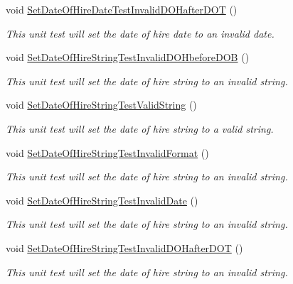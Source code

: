 \begin{DoxyCompactItemize}
void \hyperlink{class_my_all_employee_1_1_tests_1_1_full_time_employee_tests_a08e1fe6af4086293b66b5646cef6f712}{Set\+Date\+Of\+Hire\+Date\+Test\+Invalid\+D\+O\+Hafter\+D\+O\+T} ()
\begin{DoxyCompactList}\small\item\em This unit test will set the date of hire date to an invalid date. \end{DoxyCompactList}\item 
void \hyperlink{class_my_all_employee_1_1_tests_1_1_full_time_employee_tests_aebed253ddcbbee1853a6b967c93d6257}{Set\+Date\+Of\+Hire\+String\+Test\+Invalid\+D\+O\+Hbefore\+D\+O\+B} ()
\begin{DoxyCompactList}\small\item\em This unit test will set the date of hire string to an invalid string. \end{DoxyCompactList}\item 
void \hyperlink{class_my_all_employee_1_1_tests_1_1_full_time_employee_tests_a2832cf212d439622e5cd3764771c1bc4}{Set\+Date\+Of\+Hire\+String\+Test\+Valid\+String} ()
\begin{DoxyCompactList}\small\item\em This unit test will set the date of hire string to a valid string. \end{DoxyCompactList}\item 
void \hyperlink{class_my_all_employee_1_1_tests_1_1_full_time_employee_tests_a9cdc68100bbbf4e8deb270b9b63e718a}{Set\+Date\+Of\+Hire\+String\+Test\+Invalid\+Format} ()
\begin{DoxyCompactList}\small\item\em This unit test will set the date of hire string to an invalid string. \end{DoxyCompactList}\item 
void \hyperlink{class_my_all_employee_1_1_tests_1_1_full_time_employee_tests_ad6ce9c3cfd0b1970fbc8f616c40ca52d}{Set\+Date\+Of\+Hire\+String\+Test\+Invalid\+Date} ()
\begin{DoxyCompactList}\small\item\em This unit test will set the date of hire string to an invalid string. \end{DoxyCompactList}\item 
void \hyperlink{class_my_all_employee_1_1_tests_1_1_full_time_employee_tests_a6d27a8759d55854878fb6b8a00b8e7dc}{Set\+Date\+Of\+Hire\+String\+Test\+Invalid\+D\+O\+Hafter\+D\+O\+T} ()
\begin{DoxyCompactList}\small\item\em This unit test will set the date of hire string to an invalid string. \end{DoxyCompactList}\item 

\end{DoxyCompactItemize}
